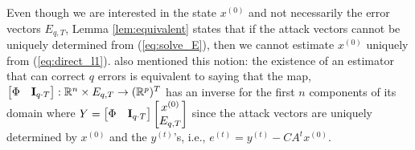 \documentclass[twocolumn]{autart}    %
\newcommand{\rev}[1]{{\normalsize{{{\color{blue}#1}}}}}
\begin{document}
Even though we are interested in the state $x^{(0)}$ and not necessarily the error vectors $E_{q,T}$, Lemma \ref{lem:equivalent} states that if the attack vectors cannot be uniquely determined from (\ref{eq:solve_E}), then we cannot estimate $x^{(0)}$ uniquely from (\ref{eq:direct_l1}). \cite{Fawzi2014} also mentioned this notion: the existence of an \rev{estimator} that can correct $q$ errors is equivalent to saying that the map, $\begin{bmatrix} \Phi & {\bf I}_{q\cdot T} \end{bmatrix}: \mathbb{R}^n \times E_{q,T} \rightarrow (\mathbb{R}^p)^T$ has an inverse for the first $n$ components of its domain where $Y = \begin{bmatrix} \Phi & {\bf I}_{q\cdot T} \end{bmatrix} \begin{bmatrix} x^{(0)} \\ E_{q,T} \end{bmatrix} $ since the attack vectors are uniquely determined by $x^{(0)}$ and the $y^{(t)}$'s, i.e., $e^{(t)} = y^{(t)} - CA ^t x^{(0)}$. 
\end{document}
